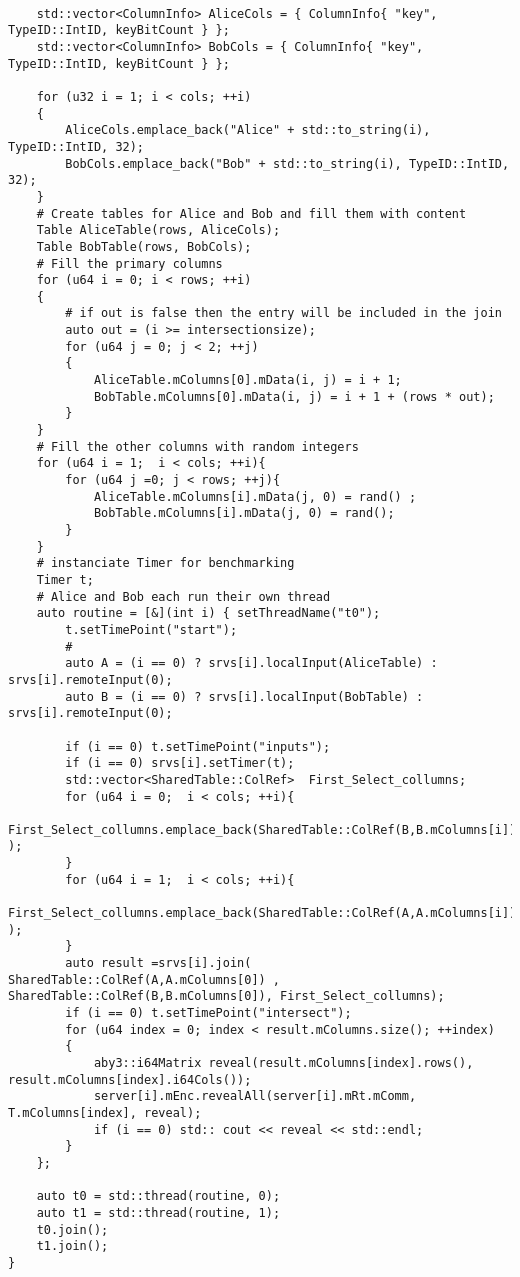 \begin{lstlisting}[caption={Simpifiyed Protocol for our first use-case in ABY3}]
	
	std::vector<ColumnInfo> AliceCols = { ColumnInfo{ "key", TypeID::IntID, keyBitCount } };
	std::vector<ColumnInfo> BobCols = { ColumnInfo{ "key", TypeID::IntID, keyBitCount } };
	
	for (u32 i = 1; i < cols; ++i)
	{
		AliceCols.emplace_back("Alice" + std::to_string(i), TypeID::IntID, 32);
		BobCols.emplace_back("Bob" + std::to_string(i), TypeID::IntID, 32);
	}
	# Create tables for Alice and Bob and fill them with content
	Table AliceTable(rows, AliceCols);
	Table BobTable(rows, BobCols);
	# Fill the primary columns 
	for (u64 i = 0; i < rows; ++i)
	{
		# if out is false then the entry will be included in the join
		auto out = (i >= intersectionsize);
		for (u64 j = 0; j < 2; ++j)
		{
			AliceTable.mColumns[0].mData(i, j) = i + 1;
			BobTable.mColumns[0].mData(i, j) = i + 1 + (rows * out);
		}
	}
	# Fill the other columns with random integers
	for (u64 i = 1;  i < cols; ++i){
		for (u64 j =0; j < rows; ++j){
			AliceTable.mColumns[i].mData(j, 0) = rand() ;
			BobTable.mColumns[i].mData(j, 0) = rand();	
		}
	}
	# instanciate Timer for benchmarking
	Timer t;
	# Alice and Bob each run their own thread 
	auto routine = [&](int i) { setThreadName("t0");
		t.setTimePoint("start");
		# 
		auto A = (i == 0) ? srvs[i].localInput(AliceTable) : srvs[i].remoteInput(0);
		auto B = (i == 0) ? srvs[i].localInput(BobTable) : srvs[i].remoteInput(0);
		
		if (i == 0) t.setTimePoint("inputs");
		if (i == 0) srvs[i].setTimer(t);
		std::vector<SharedTable::ColRef>  First_Select_collumns;		
		for (u64 i = 0;  i < cols; ++i){
			First_Select_collumns.emplace_back(SharedTable::ColRef(B,B.mColumns[i]) );
		}
		for (u64 i = 1;  i < cols; ++i){
			First_Select_collumns.emplace_back(SharedTable::ColRef(A,A.mColumns[i]) );
		}
		auto result =srvs[i].join( SharedTable::ColRef(A,A.mColumns[0]) , SharedTable::ColRef(B,B.mColumns[0]), First_Select_collumns);
		if (i == 0) t.setTimePoint("intersect");
		for (u64 index = 0; index < result.mColumns.size(); ++index)
		{
			aby3::i64Matrix reveal(result.mColumns[index].rows(),  result.mColumns[index].i64Cols());
			server[i].mEnc.revealAll(server[i].mRt.mComm, T.mColumns[index], reveal);
			if (i == 0) std:: cout << reveal << std::endl;	
		}
	};
	
	auto t0 = std::thread(routine, 0);
	auto t1 = std::thread(routine, 1);
	t0.join();
	t1.join();
}
\end{lstlisting}